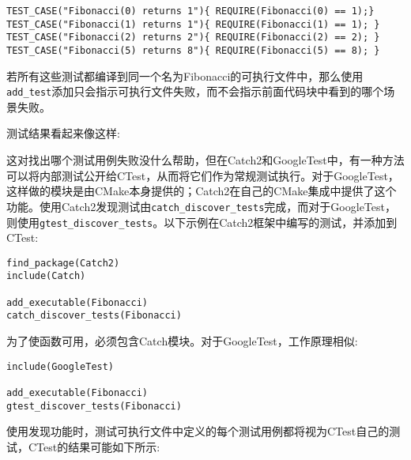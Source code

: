 \begin{lstlisting}[style=styleCXX]
TEST_CASE("Fibonacci(0) returns 1"){ REQUIRE(Fibonacci(0) == 1);}
TEST_CASE("Fibonacci(1) returns 1"){ REQUIRE(Fibonacci(1) == 1); }
TEST_CASE("Fibonacci(2) returns 2"){ REQUIRE(Fibonacci(2) == 2); }
TEST_CASE("Fibonacci(5) returns 8"){ REQUIRE(Fibonacci(5) == 8); }
\end{lstlisting}

若所有这些测试都编译到同一个名为Fibonacci的可执行文件中，那么使用\texttt{add\_test}添加只会指示可执行文件失败，而不会指示前面代码块中看到的哪个场景失败。

测试结果看起来像这样:


这对找出哪个测试用例失败没什么帮助，但在Catch2和GoogleTest中，有一种方法可以将内部测试公开给CTest，从而将它们作为常规测试执行。对于GoogleTest，这样做的模块是由CMake本身提供的；Catch2在自己的CMake集成中提供了这个功能。使用Catch2发现测试由\texttt{catch\_discover\_tests}完成，而对于GoogleTest，则使用\texttt{gtest\_discover\_tests}。以下示例在Catch2框架中编写的测试，并添加到CTest:

\begin{lstlisting}[style=styleCMake]
find_package(Catch2)
include(Catch)

add_executable(Fibonacci)
catch_discover_tests(Fibonacci)
\end{lstlisting}

为了使函数可用，必须包含Catch模块。对于GoogleTest，工作原理相似:

\begin{lstlisting}[style=styleCMake]
include(GoogleTest)

add_executable(Fibonacci)
gtest_discover_tests(Fibonacci)
\end{lstlisting}

使用发现功能时，测试可执行文件中定义的每个测试用例都将视为CTest自己的测试，CTest的结果可能如下所示:


